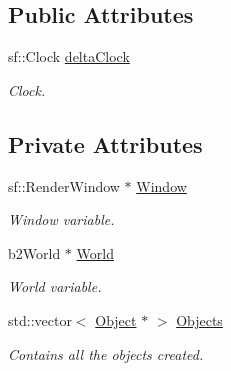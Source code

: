 \subsection*{Public Attributes}
\begin{DoxyCompactItemize}
\item 
\mbox{\label{class_game_manager_aff46e2ad7c2b424f25e3777aade8c87a}} 
sf\+::\+Clock \hyperlink{class_game_manager_aff46e2ad7c2b424f25e3777aade8c87a}{delta\+Clock}
\begin{DoxyCompactList}\small\item\em Clock. \end{DoxyCompactList}\end{DoxyCompactItemize}
\subsection*{Private Attributes}
\begin{DoxyCompactItemize}
\item 
\mbox{\label{class_game_manager_a0216b1732c0596be052ccfee53f27e19}} 
sf\+::\+Render\+Window $\ast$ \hyperlink{class_game_manager_a0216b1732c0596be052ccfee53f27e19}{Window}
\begin{DoxyCompactList}\small\item\em Window variable. \end{DoxyCompactList}\item 
\mbox{\label{class_game_manager_ab530dfeb913a8a4682e69dab57b2eff0}} 
b2\+World $\ast$ \hyperlink{class_game_manager_ab530dfeb913a8a4682e69dab57b2eff0}{World}
\begin{DoxyCompactList}\small\item\em World variable. \end{DoxyCompactList}\item 
\mbox{\label{class_game_manager_a3b42dce4375c2259786fc6a4c4ace2ea}} 
std\+::vector$<$ \hyperlink{class_object}{Object} $\ast$ $>$ \hyperlink{class_game_manager_a3b42dce4375c2259786fc6a4c4ace2ea}{Objects}
\begin{DoxyCompactList}\small\item\em Contains all the objects created. \end{DoxyCompactList}\end{DoxyCompactItemize}
